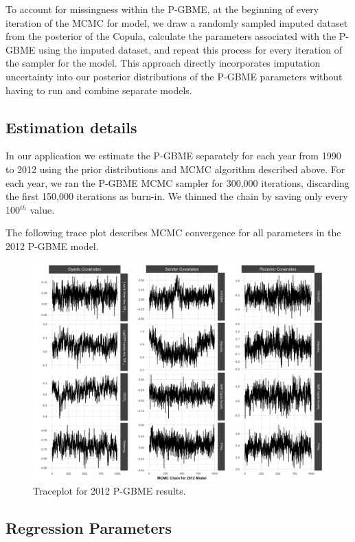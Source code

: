 \documentclass[a4paper, 12pt]{article}
\begin{document}
To account for missingness within the P-GBME, at the beginning of every iteration of the MCMC for model, we draw a randomly sampled imputed dataset from the posterior of the Copula, calculate the parameters associated with the P-GBME using the imputed dataset, and repeat this process for every iteration of the sampler for the model. This approach directly incorporates imputation uncertainty into our posterior distributions of the P-GBME parameters without having to run and combine separate models. 

\subsection{Estimation details}

In our application we estimate the P-GBME separately for each year from 1990 to 2012 using the prior distributions and MCMC algorithm described above.  For each year, we ran the P-GBME MCMC sampler for 300,000 iterations, discarding the first 150,000 iterations as burn-in. We thinned the chain by saving only every 100$^{th}$ value. 

The following trace plot describes MCMC convergence for all parameters in the 2012 P-GBME model.  

\begin{figure}[ht]
\centering
\includegraphics[width=1\textwidth]{figureA2}
\caption{Traceplot for 2012 P-GBME results.}
\label{fig:trace}
\end{figure}
\FloatBarrier

\subsection{Regression Parameters}
\end{document}
